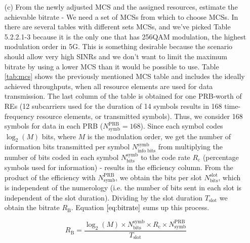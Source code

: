 \begin{itemize}
\begin{itemize}
        \item[(c)] From the newly adjusted MCS and the assigned resources, estimate the achievable bitrate - 
        We need a set of MCSs from which to choose MCSs. In \cite{3gpp-codebooks} there are several tables with different sets MCSs, and we've picked Table 5.2.2.1-3 because it is the only one that has 256QAM modulation, the highest modulation order in 5G. This is something desirable because the scenario should allow very high SINRs and we don't want to limit the maximum bitrate by using a lower MCS than it would be possible to use. Table \ref{tab:mcs} shows the previously mentioned MCS table and includes the ideally achieved throughputs, when all resource elements are used for data transmission. The last column of the table is obtained for one PRB-worth of \acsp{RE} (12 subcarriers used for the duration of 14 symbols results in 168 time-frequency resource elements, or transmitted symbols). Thus, we consider 168 symbols for data in each PRB ($N_\text{symb}^\text{PRB} = 168$). Since each symbol codes $\log_2(M)$ bits, where $M$ is the modulation order, we get the number of information bits transmitted per symbol $N_\text{info bits}^\text{symb}$ from multiplying the number of bits coded in each symbol $N_\text{bits}^\text{symb}$ to the code rate $R_\text{c}$ (percentage symbols used for information) - results in the efficiency column. From the product of the efficiency with $N_\text{symb}^\text{PRB}$, we obtain the bits per slot $N_\text{bits}^\text{slot}$, which is independent of the numerology (i.e. the number of bits sent in each slot is independent of the slot duration). Dividing by the slot duration $T_\text{slot}$ we obtain the bitrate $R_\text{B}$. Equation $\eqref{eq:bitrate}$ sums up this process.

        \begin{equation} \label{eq:bitrate}
            R_\text{B} = \frac{\log_2(M) \times N_\text{bits}^\text{symb} \times R_\text{c} \times N_\text{symb}^\text{PRB}}{T_\text{slot}}
        \end{equation}


\end{itemize}
\end{itemize}
